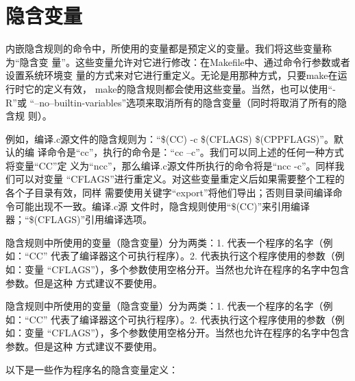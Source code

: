 \section{隐含变量}
内嵌隐含规则的命令中，所使用的变量都是预定义的变量。我们将这些变量称为“隐含变
量”。这些变量允许对它进行修改：在Makefile中、通过命令行参数或者设置系统环境变
量的方式来对它进行重定义。无论是用那种方式，只要make在运行时它的定义有效，
make的隐含规则都会使用这些变量。当然，也可以使用“-R”或
“--no–builtin-variables”选项来取消所有的隐含变量（同时将取消了所有的隐含规
则）。

例如，编译.c源文件的隐含规则为：“\$(CC) -c \$(CFLAGS) \$(CPPFLAGS)”。默认的编
译命令是“cc”，执行的命令是：“cc –c”。我们可以同上述的任何一种方式将变量“CC”定
义为“ncc”，那么编译.c源文件所执行的命令将是“ncc -c”。同样我们可以对变量
“CFLAGS”进行重定义。对这些变量重定义后如果需要整个工程的各个子目录有效，同样
需要使用关键字“export”将他们导出；否则目录间编译命令可能出现不一致。编译.c源
文件时，隐含规则使用“\$(CC)”来引用编译器；“\$(CFLAGS)”引用编译选项。

隐含规则中所使用的变量（隐含变量）分为两类：1. 代表一个程序的名字（例如：“CC”
代表了编译器这个可执行程序）。2. 代表执行这个程序使用的参数（例如：变量
“CFLAGS”），多个参数使用空格分开。当然也允许在程序的名字中包含参数。但是这种
方式建议不要使用。

隐含规则中所使用的变量（隐含变量）分为两类：1. 代表一个程序的名字（例如：“CC”
代表了编译器这个可执行程序）。2. 代表执行这个程序使用的参数（例如：变量
“CFLAGS”），多个参数使用空格分开。当然也允许在程序的名字中包含参数。但是这种
方式建议不要使用。

以下是一些作为程序名的隐含变量定义：

